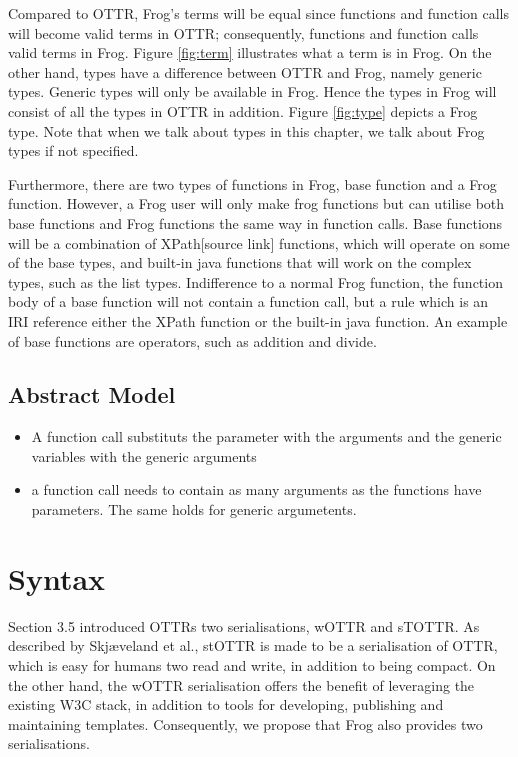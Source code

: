 \para
Compared to OTTR, Frog's terms will be equal since functions and function calls will become valid terms in OTTR; consequently, functions and function calls valid terms in Frog. Figure \ref{fig:term} illustrates what a term is in Frog. On the other hand, types have a difference between OTTR and Frog, namely generic types. Generic types will only be available in Frog. Hence the types in Frog will consist of all the types in OTTR in addition. Figure \ref{fig:type} depicts a Frog type. Note that when we talk about types in this chapter, we talk about Frog types if not specified.

\para
Furthermore, there are two types of functions in Frog, base function and a Frog function. However, a Frog user will only make frog functions but can utilise both base functions and Frog functions the same way in function calls. Base functions will be a combination of XPath[source link] functions, which will operate on some of the base types, and built-in java functions that will work on the complex types, such as the list types. Indifference to a normal Frog function, the function body of a base function will not contain a function call, but a rule which is an IRI reference either the XPath function or the built-in java function. An example of base functions are operators, such as addition and divide.

\subsection{Abstract Model}
\begin{itemize}
    \item A function call substituts the parameter with the arguments and the generic variables with the generic arguments 
    \item a function call needs to contain as many arguments as the functions have parameters. The same holds for generic argumetents. 
\end{itemize}

\section{Syntax}
Section 3.5 introduced OTTRs two serialisations, wOTTR and sTOTTR. As described by Skjæveland et al., stOTTR is made to be a serialisation of OTTR, which is easy for humans two read and write, in addition to being compact\autocite[4]{SLKK_OTTR_2021}. On the other hand, the wOTTR serialisation offers the benefit of leveraging the existing W3C stack, in addition to tools for developing, publishing and maintaining templates\autocite[481-482]{SLKF_OTTR_2018}. Consequently, we propose that Frog also provides two serialisations.

